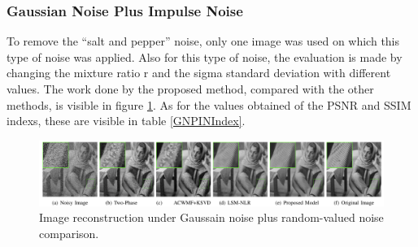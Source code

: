 \subsubsection{Gaussian Noise Plus Impulse Noise}
To remove the “salt and pepper” noise, only one image was used on which 
this type of noise was applied. Also for this type of noise, the evaluation is 
made by changing the mixture ratio r and the sigma standard deviation with 
different values. The work done by the proposed method, compared with the 
other methods, is visible in figure \ref{fig:saltComp}. As for the values obtained of the PSNR 
and SSIM indexs, these are visible in table \ref{GNPINIndex}.
\begin{figure}[h!]
    \centering
    \includegraphics[width = \linewidth]{images/paper7/salt.png}
    \centering
    \caption{Image reconstruction under Gaussain noise plus random-valued noise comparison.}
    \label{fig:saltComp}
\end{figure}

